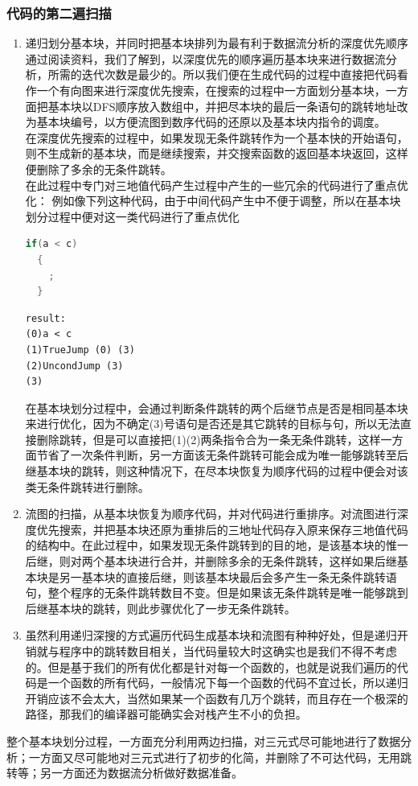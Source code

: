 \documentclass[12pt,a4paper,Flow]{report}
\begin{document}
\subsubsection{代码的第二遍扫描}
\begin{enumerate}
\item 递归划分基本块，并同时把基本块排列为最有利于数据流分析的深度优先顺序\\
\indent 通过阅读资料，我们了解到，以深度优先的顺序遍历基本块来进行数据流分析，所需的迭代次数是最少的。所以我们便在生成代码的过程中直接把代码看作一个有向图来进行深度优先搜索，在搜索的过程中一方面划分基本块，一方面把基本块以DFS顺序放入数组中，并把尽本块的最后一条语句的跳转地址改为基本块编号，以方便流图到数序代码的还原以及基本块内指令的调度。\\
\indent	在深度优先搜索的过程中，如果发现无条件跳转作为一个基本快的开始语句，则不生成新的基本块，而是继续搜索，并交搜索函数的返回基本块返回，这样便删除了多余的无条件跳转。\\
\indent	在此过程中专门对三地值代码产生过程中产生的一些冗余的代码进行了重点优化：
例如像下列这种代码，由于中间代码产生中不便于调整，所以在基本块划分过程中便对这一类代码进行了重点优化
\begin{lstlisting}[language=c]
  if(a < c)
  {
	;
  }
\end{lstlisting}
\begin{verbatim}
result:
(0)a < c
(1)TrueJump (0) (3)
(2)UncondJump (3)
(3)
\end{verbatim}
在基本块划分过程中，会通过判断条件跳转的两个后继节点是否是相同基本块来进行优化，因为不确定(3)号语句是否还是其它跳转的目标与句，所以无法直接删除跳转，但是可以直接把(1)(2)两条指令合为一条无条件跳转，这样一方面节省了一次条件判断，另一方面该无条件跳转可能会成为唯一能够跳转至后继基本块的跳转，则这种情况下，在尽本块恢复为顺序代码的过程中便会对该类无条件跳转进行删除。
\item 流图的扫描，从基本块恢复为顺序代码，并对代码进行重排序。对流图进行深度优先搜索，并把基本块还原为重排后的三地址代码存入原来保存三地值代码的结构中。在此过程中，如果发现无条件跳转到的目的地，是该基本块的惟一后继，则对两个基本块进行合并，并删除多余的无条件跳转，这样如果后继基本块是另一基本块的直接后继，则该基本块最后会多产生一条无条件跳转语句，整个程序的无条件跳转数目不变。但是如果该无条件跳转是唯一能够跳到后继基本块的跳转，则此步骤优化了一步无条件跳转。
\item 虽然利用递归深搜的方式遍历代码生成基本块和流图有种种好处，但是递归开销就与程序中的跳转数目相关，当代码量较大时这确实也是我们不得不考虑的。但是基于我们的所有优化都是针对每一个函数的，也就是说我们遍历的代码是一个函数的所有代码，一般情况下每一个函数的代码不宜过长，所以递归开销应该不会太大，当然如果某一个函数有几万个跳转，而且存在一个极深的路径，那我们的编译器可能确实会对栈产生不小的负担。
\end{enumerate}
整个基本块划分过程，一方面充分利用两边扫描，对三元式尽可能地进行了数据分析；一方面又尽可能地对三元式进行了初步的化简，并删除了不可达代码，无用跳转等；另一方面还为数据流分析做好数据准备。
\end{document}
